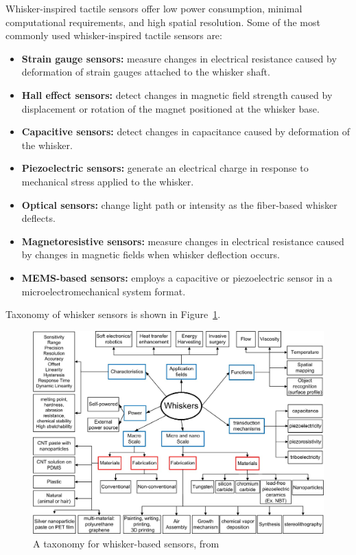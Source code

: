 Whisker-inspired tactile sensors offer low power consumption, minimal computational requirements, and high spatial resolution.
Some of the most commonly used whisker-inspired tactile sensors are:~\cite{s22072705}
\begin{itemize}
    \item \textbf{Strain gauge sensors:} measure changes in electrical resistance caused by deformation of strain gauges attached to the whisker shaft.
    \item \textbf{Hall effect sensors:} detect changes in magnetic field strength caused by displacement or rotation of the magnet positioned at the whisker base.
    \item \textbf{Capacitive sensors:} detect changes in capacitance caused by deformation of the whisker.
    \item \textbf{Piezoelectric sensors:} generate an electrical charge in response to mechanical stress applied to the whisker.
    \item \textbf{Optical sensors:} change light path or intensity as the fiber-based whisker deflects.
    \item \textbf{Magnetoresistive sensors:} measure changes in electrical resistance caused by changes in magnetic fields when whisker deflection occurs.
    \item \textbf{MEMS-based sensors:} employs a capacitive or piezoelectric sensor in a microelectromechanical system format.
\end{itemize}
Taxonomy of whisker sensors is shown in Figure~\ref{fig:taxonomy}.

\begin{figure}[htb]
    \centering
    \includegraphics[width=0.65\textheight]{figures/taxonomy}
    \caption{A taxonomy for whisker-based sensors, from \cite{s22072705}}
    \label{fig:taxonomy}
\end{figure}



